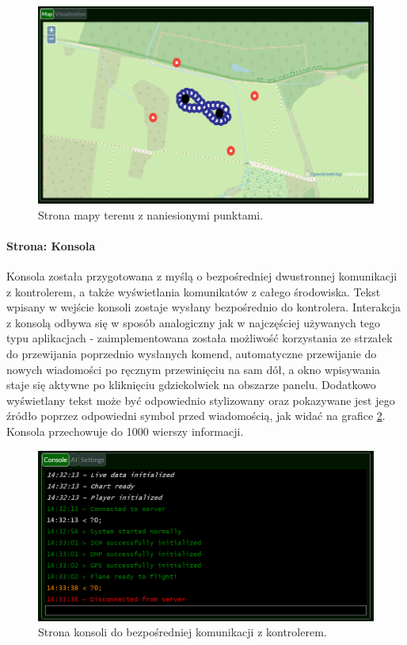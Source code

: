 \documentclass[12pt, a4paper]{article}
\begin{document}
 \begin{figure}[H]
    \centering
    \includegraphics[width=1\textwidth]{mapa}
    \caption{Strona mapy terenu z naniesionymi punktami.}
    \label{fig:mapa}
\end{figure}


\paragraph{Strona: Konsola}\mbox{}

Konsola została przygotowana z myślą o bezpośredniej dwustronnej komunikacji z kontrolerem, a także wyświetlania komunikatów z całego środowiska. Tekst wpisany w wejście konsoli zostaje wysłany bezpośrednio do kontrolera. Interakcja z konsolą odbywa się w sposób analogiczny jak w najczęściej używanych tego typu aplikacjach - zaimplementowana została możliwość korzystania ze strzałek do przewijania poprzednio wysłanych komend, automatyczne przewijanie do nowych wiadomości po ręcznym przewinięciu na sam dół, a okno wpisywania staje się aktywne po kliknięciu gdziekolwiek na obszarze panelu. Dodatkowo wyświetlany tekst może być odpowiednio stylizowany oraz pokazywane jest jego źródło poprzez odpowiedni symbol przed wiadomością, jak widać na grafice \ref{fig:konsola}. Konsola przechowuje do 1000 wierszy informacji.

 \begin{figure}[H]
    \centering
    \includegraphics[width=1\textwidth]{konsola}
    \caption{Strona konsoli do bezpośredniej komunikacji z kontrolerem.}
    \label{fig:konsola}
\end{figure}
\end{document}
